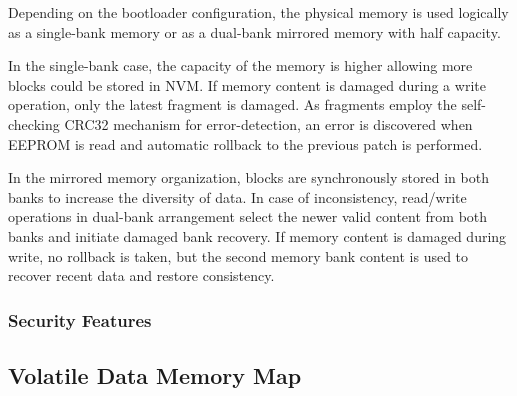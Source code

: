  Depending on the bootloader configuration, the physical memory is used logically as a single-bank memory or as a dual-bank mirrored memory with half capacity. 

 
 In the single-bank case, the capacity of the memory is higher allowing more blocks could be stored in NVM. 
 If memory content is damaged during a write operation, only the latest fragment is damaged. 
 As fragments employ the self-checking CRC32 mechanism for error-detection, an error is discovered when EEPROM is read and automatic rollback to the previous patch is performed.

 In the mirrored memory organization, blocks are synchronously stored in both banks to increase the diversity of data. 
 In case of inconsistency, read/write operations in dual-bank arrangement select the newer valid content from both banks and initiate damaged bank recovery.
 If memory content is damaged during write, no rollback is taken, but the second memory bank content is used to recover recent data and restore consistency.
 
 
\subsubsection{Security Features}\label{sec:arch:EEPROMMap:sec}

\clearpage
\subsection{Volatile Data Memory Map} \label{sec:arch:RAMMap}


